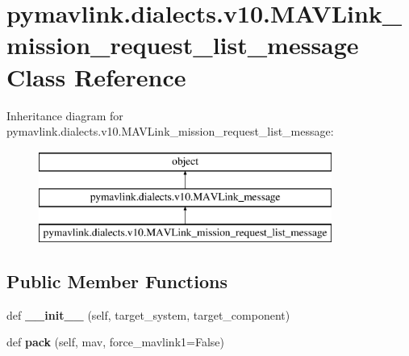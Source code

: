 \hypertarget{classpymavlink_1_1dialects_1_1v10_1_1MAVLink__mission__request__list__message}{}\section{pymavlink.\+dialects.\+v10.\+M\+A\+V\+Link\+\_\+mission\+\_\+request\+\_\+list\+\_\+message Class Reference}
\label{classpymavlink_1_1dialects_1_1v10_1_1MAVLink__mission__request__list__message}
Inheritance diagram for pymavlink.\+dialects.\+v10.\+M\+A\+V\+Link\+\_\+mission\+\_\+request\+\_\+list\+\_\+message\+:\begin{figure}[H]
\begin{center}
\leavevmode
\includegraphics[height=3.000000cm]{classpymavlink_1_1dialects_1_1v10_1_1MAVLink__mission__request__list__message}
\end{center}
\end{figure}
\subsection*{Public Member Functions}
\begin{DoxyCompactItemize}
\item 
\mbox{\label{classpymavlink_1_1dialects_1_1v10_1_1MAVLink__mission__request__list__message_a714e5e46ec0c9d9ad7ac0240b83a0b6e}} 
def {\bfseries \+\_\+\+\_\+init\+\_\+\+\_\+} (self, target\+\_\+system, target\+\_\+component)
\item 
\mbox{\label{classpymavlink_1_1dialects_1_1v10_1_1MAVLink__mission__request__list__message_a739275589bdc959ff671a48c84a91caa}} 
def {\bfseries pack} (self, mav, force\+\_\+mavlink1=False)
\end{DoxyCompactItemize}
